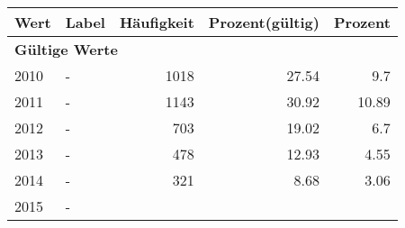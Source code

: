      \begin{longtable}{lXrrr}
     \toprule
     \textbf{Wert} & \textbf{Label} & \textbf{Häufigkeit} & \textbf{Prozent(gültig)} & \textbf{Prozent} \\
     \endhead
     \midrule
     \multicolumn{5}{l}{\textbf{Gültige Werte}}\\

     2010 &
     \multicolumn{1}{X}{ -  } &


       \num{1018} &
       \num[round-mode=places,round-precision=2]{27.54} &
         \num[round-mode=places,round-precision=2]{9.7} \\

     2011 &
     \multicolumn{1}{X}{ -  } &


       \num{1143} &
       \num[round-mode=places,round-precision=2]{30.92} &
         \num[round-mode=places,round-precision=2]{10.89} \\

     2012 &
     \multicolumn{1}{X}{ -  } &


       \num{703} &
       \num[round-mode=places,round-precision=2]{19.02} &
         \num[round-mode=places,round-precision=2]{6.7} \\

     2013 &
     \multicolumn{1}{X}{ -  } &


       \num{478} &
       \num[round-mode=places,round-precision=2]{12.93} &
         \num[round-mode=places,round-precision=2]{4.55} \\

     2014 &
     \multicolumn{1}{X}{ -  } &


       \num{321} &
       \num[round-mode=places,round-precision=2]{8.68} &
         \num[round-mode=places,round-precision=2]{3.06} \\

     2015 &
     \multicolumn{1}{X}{ -  } &



\end{longtable}
